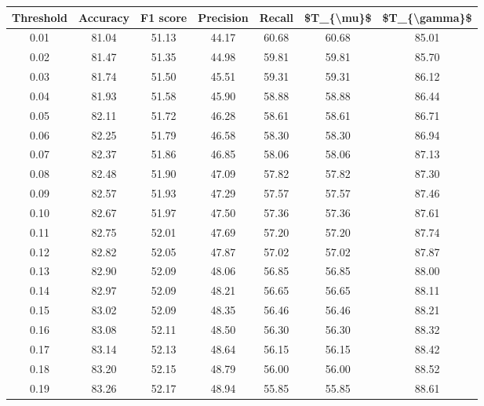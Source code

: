 \begin{tabular}{|c|c|c|c|c|c|c|}
\hline
 Threshold &  Accuracy &  F1 score &  Precision &  Recall &  \$T\_\{\textbackslash mu\}\$ &  \$T\_\{\textbackslash gamma\}\$ \\
\hline
      0.01 &     81.04 &     51.13 &      44.17 &   60.68 &      60.68 &         85.01 \\
      0.02 &     81.47 &     51.35 &      44.98 &   59.81 &      59.81 &         85.70 \\
      0.03 &     81.74 &     51.50 &      45.51 &   59.31 &      59.31 &         86.12 \\
      0.04 &     81.93 &     51.58 &      45.90 &   58.88 &      58.88 &         86.44 \\
      0.05 &     82.11 &     51.72 &      46.28 &   58.61 &      58.61 &         86.71 \\
      0.06 &     82.25 &     51.79 &      46.58 &   58.30 &      58.30 &         86.94 \\
      0.07 &     82.37 &     51.86 &      46.85 &   58.06 &      58.06 &         87.13 \\
      0.08 &     82.48 &     51.90 &      47.09 &   57.82 &      57.82 &         87.30 \\
      0.09 &     82.57 &     51.93 &      47.29 &   57.57 &      57.57 &         87.46 \\
      0.10 &     82.67 &     51.97 &      47.50 &   57.36 &      57.36 &         87.61 \\
      0.11 &     82.75 &     52.01 &      47.69 &   57.20 &      57.20 &         87.74 \\
      0.12 &     82.82 &     52.05 &      47.87 &   57.02 &      57.02 &         87.87 \\
      0.13 &     82.90 &     52.09 &      48.06 &   56.85 &      56.85 &         88.00 \\
      0.14 &     82.97 &     52.09 &      48.21 &   56.65 &      56.65 &         88.11 \\
      0.15 &     83.02 &     52.09 &      48.35 &   56.46 &      56.46 &         88.21 \\
      0.16 &     83.08 &     52.11 &      48.50 &   56.30 &      56.30 &         88.32 \\
      0.17 &     83.14 &     52.13 &      48.64 &   56.15 &      56.15 &         88.42 \\
      0.18 &     83.20 &     52.15 &      48.79 &   56.00 &      56.00 &         88.52 \\
      0.19 &     83.26 &     52.17 &      48.94 &   55.85 &      55.85 &         88.61 \\

\end{tabular}
